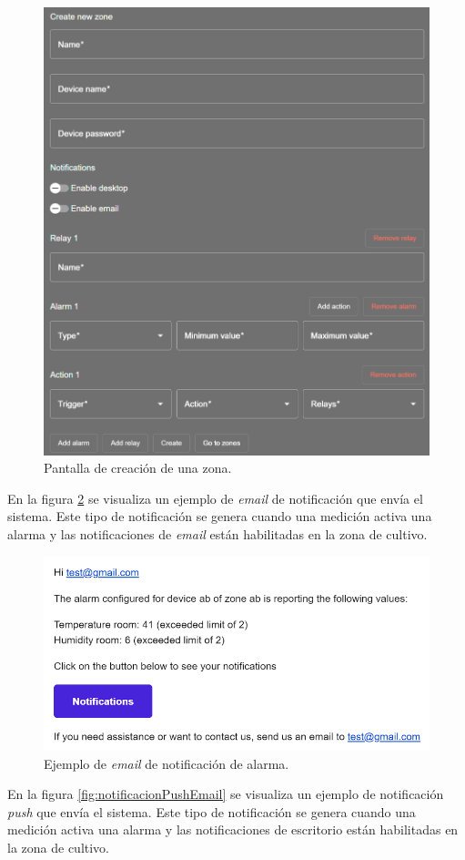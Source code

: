 \begin{figure}[H]
	\centering
	\includegraphics[width=.7\textwidth]{./Figures/Frontend formulario de zona.png}
	\caption{Pantalla de creación de una zona.}
	\label{fig:formularioDeZona}
\end{figure}

En la figura \ref{fig:notificacionAlarmaEmail} se visualiza un ejemplo de \textit{email} de notificación que envía el sistema. Este tipo de notificación se genera cuando una medición activa una alarma y las notificaciones de \textit{email} están habilitadas en la zona de cultivo.

\begin{figure}[H]
	\centering
	\includegraphics[width=.9\textwidth]{./Figures/Notificacion email.png}
	\caption{Ejemplo de \textit{email} de notificación de alarma.}
	\label{fig:notificacionAlarmaEmail}
\end{figure}

En la figura \ref{fig:notificacionPushEmail} se visualiza un ejemplo de notificación \emph{push} que envía el sistema. Este tipo de notificación se genera cuando una medición activa una alarma y las notificaciones de escritorio están habilitadas en la zona de cultivo.


